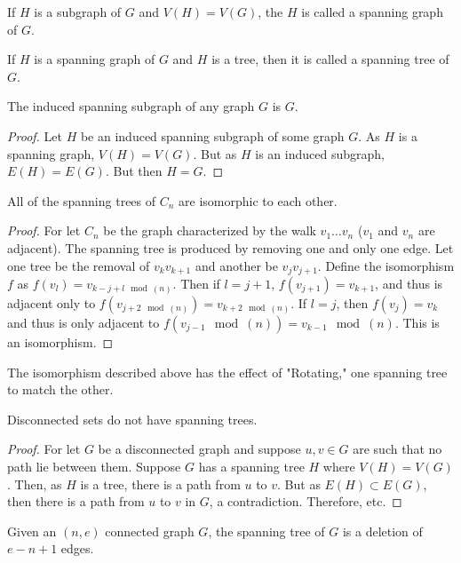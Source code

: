\documentclass[crop=false,class=book]{standalone}
\begin{document}
\begin{definition}
If $H$ is a subgraph of $G$ and $V(H)=V(G)$, the $H$ is called a spanning graph of $G$.
\end{definition}
\begin{definition}
If $H$ is a spanning graph of $G$ and $H$ is a tree, then it is called a spanning tree of $G$.
\end{definition}
\begin{corollary}
The induced spanning subgraph of any graph $G$ is $G$.
\end{corollary}
\begin{proof}
Let $H$ be an induced spanning subgraph of some graph $G$. As $H$ is a spanning graph, $V(H)=V(G)$. But as $H$ is an induced subgraph, $E(H)=E(G)$. But then $H=G$.
\end{proof}
\begin{theorem}
All of the spanning trees of $C_n$ are isomorphic to each other.
\end{theorem}
\begin{proof}
For let $C_n$ be the graph characterized by the walk $v_1\hdots v_n$ ($v_1$ and $v_n$ are adjacent). The spanning tree is produced by removing one and only one edge. Let one tree be the removal of $v_{k}v_{k+1}$ and another be $v_{j}v_{j+1}$. Define the isomorphism $f$ as $f(v_l) = v_{k-j+l \mod(n)}$. Then if $l=j+1$, $f(v_{j+1}) = v_{k+1}$, and thus is adjacent only to $f(v_{j+2 \mod(n)}) = v_{k+2\mod(n)}$. If $l=j$, then $f(v_j) = v_k$ and thus is only adjacent to $f(v_{j-1}\mod(n)) = v_{k-1}\mod(n)$. This is an isomorphism.
\end{proof}
\begin{remark}
The isomorphism described above has the effect of "Rotating," one spanning tree to match the other.
\end{remark}
\begin{theorem}
Disconnected sets do not have spanning trees.
\end{theorem}
\begin{proof}
For let $G$ be a disconnected graph and suppose $u,v\in G$ are such that no path lie between them. Suppose $G$ has a spanning tree $H$ where $V(H)=V(G)$. Then, as $H$ is a tree, there is a path from $u$ to $v$. But as $E(H)\subset E(G)$, then there is a path from $u$ to $v$ in $G$, a contradiction. Therefore, etc.
\end{proof}
\begin{theorem}
Given an $(n,e)$ connected graph $G$, the spanning tree of $G$ is a deletion of $e-n+1$ edges.
\end{theorem}
\end{document}
